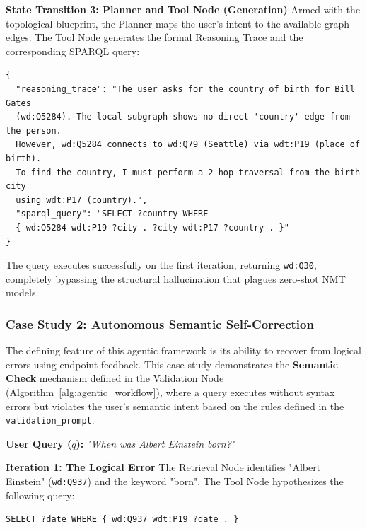 \textbf{State Transition 3: Planner and Tool Node (Generation)}
Armed with the topological blueprint, the Planner maps the user's intent to the available graph edges. The Tool Node generates the formal Reasoning Trace and the corresponding SPARQL query:

\noindent
\begin{minipage}{\textwidth}
\begin{lstlisting}[basicstyle=\ttfamily\footnotesize, frame=single, caption={Tool Node Query Generation}, label={lst:tool_gen}]
{
  "reasoning_trace": "The user asks for the country of birth for Bill Gates 
  (wd:Q5284). The local subgraph shows no direct 'country' edge from the person. 
  However, wd:Q5284 connects to wd:Q79 (Seattle) via wdt:P19 (place of birth).
  To find the country, I must perform a 2-hop traversal from the birth city 
  using wdt:P17 (country).",
  "sparql_query": "SELECT ?country WHERE 
  { wd:Q5284 wdt:P19 ?city . ?city wdt:P17 ?country . }"
}
\end{lstlisting}
\end{minipage}

The query executes successfully on the first iteration, returning \texttt{wd:Q30}, completely bypassing the structural hallucination that plagues zero-shot NMT models.

\subsubsection{Case Study 2: Autonomous Semantic Self-Correction}
The defining feature of this agentic framework is its ability to recover from logical errors using endpoint feedback. This case study demonstrates the \textbf{Semantic Check} mechanism defined in the Validation Node (Algorithm~\ref{alg:agentic_workflow}), where a query executes without syntax errors but violates the user's semantic intent based on the rules defined in the \texttt{validation\_prompt}.

\textbf{User Query ($q$):} \textit{"When was Albert Einstein born?"}

\textbf{Iteration 1: The Logical Error}
The Retrieval Node identifies "Albert Einstein" (\texttt{wd:Q937}) and the keyword "born". The Tool Node hypothesizes the following query:

\noindent
\begin{minipage}{\textwidth}
\begin{lstlisting}[basicstyle=\ttfamily\footnotesize, frame=single, caption={Iteration 1: Incorrect Property Selection}, label={lst:iteration_1}]
SELECT ?date WHERE { wd:Q937 wdt:P19 ?date . }
\end{lstlisting}
\end{minipage}

